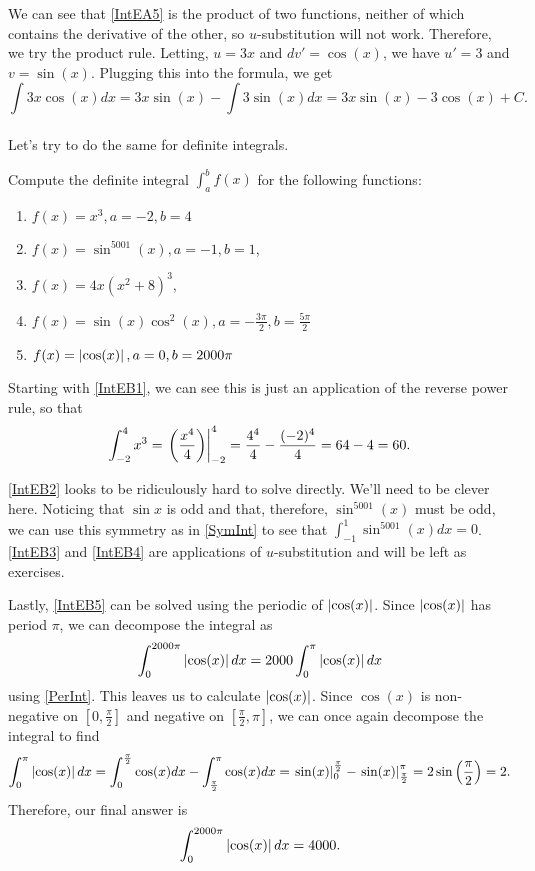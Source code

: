 \begin{exmps}
We can see that \ref{IntEA5} is the product of two functions, neither of which contains the derivative of the other, so $u$-substitution will not work. Therefore, we try the product rule. Letting, $u=3x$ and $dv'=\cos(x)$, we have $u'=3$ and $v=\sin(x)$. Plugging this into the formula, we get
\[
\int 3x\cos(x)dx= 3x\sin(x)-\int 3\sin(x)dx=3x\sin(x)-3\cos(x)+C.
\]
\\

Let's try to do the same for definite integrals.

Compute the definite integral $\int_{a}^{b} f(x)$ for the following functions:
\begin{enumerate}[label=\textbf{Example B.\arabic*.}]
  \addtolength{\itemindent}{1.625cm} %
  \item \label{IntEB1} $f(x)=x^3, a=-2, b=4$
  \item \label{IntEB2} $f(x)=\sin^{5001}(x), a=-1, b=1$, %
  \item \label{IntEB3} $f(x)=4x(x^2+8)^3$,               %
  \item \label{IntEB4} $f(x)=\sin(x)\cos^2(x), a=-\frac{3\pi}{2},b=\frac{5\pi}{2}$ %
  \item \label{IntEB5} $f(x)=\left| \cos(x) \right|, a=0, b=2000\pi$ %
\end{enumerate}

Starting with \ref{IntEB1}, we can see this is just an application of the reverse power rule, so that
\[
\int_{-2}^{4}x^3=\left. \left(\frac{x^4}{4}\right) \right|^{4}_{-2}=\frac{4^4}{4}-\frac{(-2)^4}{4}=64-4=60.
\]

\ref{IntEB2} looks to be ridiculously hard to solve directly. We'll need to be clever here. Noticing that $\sin x$ is odd and that, therefore, $\sin^{5001}(x)$ must be odd, we can use this symmetry as in \cref{SymInt} to see that $\int_{-1}^{1} \sin^{5001}(x)dx=0$.\\


\ref{IntEB3} and \ref{IntEB4} are applications of $u$-substitution and will be left as exercises.

Lastly, \ref{IntEB5} can be solved using the periodic of $\left| \cos (x) \right|$. Since $\left| \cos (x) \right|$ has period $\pi$, we can decompose the integral as
\[
\int_{0}^{2000\pi}\left| \cos(x) \right|dx=2000\int_{0}^{\pi}\left| \cos(x) \right|dx
\]
using \cref{PerInt}. This leaves us to calculate $\left| \cos(x) \right|$. Since $\cos(x)$ is non-negative on $[0,\frac{\pi}{2}]$ and negative on $[\frac{\pi}{2}, \pi]$, we can once again decompose the integral to find
\[
\int_{0}^{\pi}\left| \cos(x) \right|dx= \int_{0}^{\frac{\pi}{2}}\cos(x)dx-\int_{\frac{\pi}{2}}^{\pi}\cos(x)dx=\left. \sin(x) \right|_{0}^{\frac{\pi}{2}}-\left. \sin(x) \right|_{\frac{\pi}{2}}^{\pi}=2\sin\left(\frac{\pi}{2}\right)=2.
\]
Therefore, our final answer is
\[
\int_{0}^{2000\pi}\left| \cos(x) \right|dx=4000.
\]
\end{exmps}


